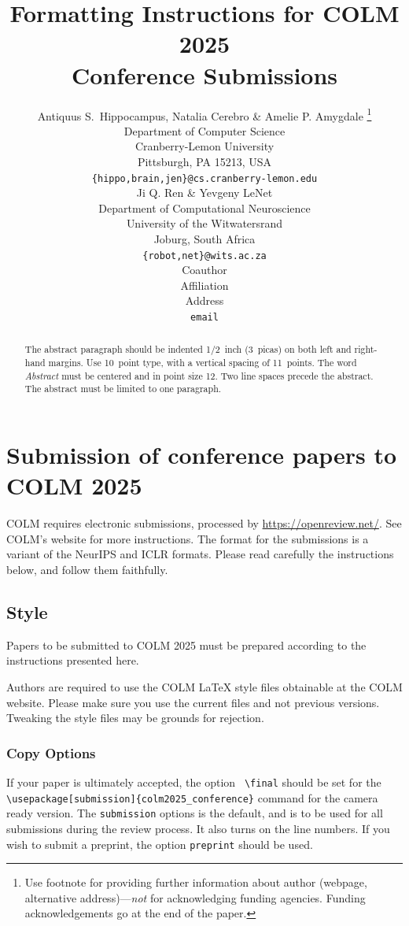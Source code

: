\documentclass{article} %
\title{Formatting Instructions for COLM 2025 \\ Conference Submissions}
\author{Antiquus S.~Hippocampus, Natalia Cerebro \& Amelie P. Amygdale \thanks{ Use footnote for providing further information
about author (webpage, alternative address)---\emph{not} for acknowledging
funding agencies.  Funding acknowledgements go at the end of the paper.} \\
Department of Computer Science\\
Cranberry-Lemon University\\
Pittsburgh, PA 15213, USA \\
\texttt{\{hippo,brain,jen\}@cs.cranberry-lemon.edu} \\
\And
Ji Q. Ren \& Yevgeny LeNet \\
Department of Computational Neuroscience \\
University of the Witwatersrand \\
Joburg, South Africa \\
\texttt{\{robot,net\}@wits.ac.za} \\
\AND
Coauthor \\
Affiliation \\
Address \\
\texttt{email}
}
\begin{document}
\ifcolmsubmission
\linenumbers
\fi

\maketitle

\begin{abstract}
The abstract paragraph should be indented 1/2~inch (3~picas) on both left and
right-hand margins. Use 10~point type, with a vertical spacing of 11~points.
The word \textit{Abstract} must be centered and in point size 12. Two
line spaces precede the abstract. The abstract must be limited to one
paragraph.
\end{abstract}

\section{Submission of conference papers to COLM 2025}

COLM requires electronic submissions, processed by
\url{https://openreview.net/}. See COLM's website for more instructions.
The format for the submissions is a variant of the NeurIPS and ICLR formats.
Please read carefully the instructions below, and follow them
faithfully.


\subsection{Style}

Papers to be submitted to COLM 2025 must be prepared according to the
instructions presented here.


Authors are required to use the COLM \LaTeX{} style files obtainable at the
COLM website. Please make sure you use the current files and
not previous versions. Tweaking the style files may be grounds for rejection.

\subsubsection{Copy Options}

If your paper is ultimately accepted, the option {\tt
  {\textbackslash}final} should be set  for the {\tt {\textbackslash}usepackage[submission]\{colm2025\_conference\}} command for the camera ready version. The {\tt submission} options is the default, and is to be used for all submissions during the review process. It also turns on the line numbers. If you wish to submit a preprint, the option {\tt preprint} should be used.
  
\end{document}
